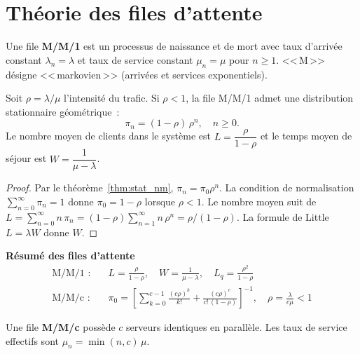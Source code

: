 \section{Th\'eorie des files d'attente}
\label{sec:files_attente}

\begin{definition}[File M/M/1]
Une file \textbf{M/M/1} est un processus de naissance et de mort avec
taux d'arriv\'ee constant $\lambda_n = \lambda$ et taux de service
constant $\mu_n = \mu$ pour $n \geq 1$. <<\,M\,>> d\'esigne
<<\,markovien\,>> (arriv\'ees et services exponentiels).
\end{definition}

\begin{theoreme}
\label{thm:mm1}
Soit $\rho = \lambda / \mu$ l'intensit\'e du trafic.
Si $\rho < 1$, la file M/M/1 admet une distribution stationnaire
g\'eom\'etrique~:
\[
  \pi_n = (1-\rho)\,\rho^n, \quad n \geq 0.
\]
Le nombre moyen de clients dans le syst\`eme est
$L = \dfrac{\rho}{1-\rho}$
et le temps moyen de s\'ejour est
$W = \dfrac{1}{\mu - \lambda}$.
\end{theoreme}

\begin{proof}
Par le th\'eor\`eme~\ref{thm:stat_nm}, $\pi_n = \pi_0 \rho^n$.
La condition de normalisation $\sum_{n=0}^{\infty} \pi_n = 1$ donne
$\pi_0 = 1 - \rho$ lorsque $\rho < 1$. Le nombre moyen suit de
$L = \sum_{n=0}^{\infty} n\,\pi_n = (1-\rho) \sum_{n=1}^{\infty} n\,\rho^n
= \rho/(1-\rho)$. La formule de Little
$L = \lambda W$ donne $W$.
\end{proof}

\begin{formules}
\textbf{R\'esum\'e des files d'attente}
\begin{align*}
  \text{M/M/1 :}\quad & L = \frac{\rho}{1-\rho}, \quad
    W = \frac{1}{\mu - \lambda}, \quad
    L_q = \frac{\rho^2}{1-\rho} \\[6pt]
  \text{M/M/c :}\quad & \pi_0 = \left[\sum_{k=0}^{c-1}
    \frac{(c\rho)^k}{k!} + \frac{(c\rho)^c}{c!\,(1-\rho)}\right]^{-1},
    \quad \rho = \frac{\lambda}{c\mu} < 1
\end{align*}
\end{formules}

\begin{definition}[File M/M/c]
Une file \textbf{M/M/c} poss\`ede $c$ serveurs identiques en parall\`ele.
Les taux de service effectifs sont $\mu_n = \min(n, c)\,\mu$.
\end{definition}

